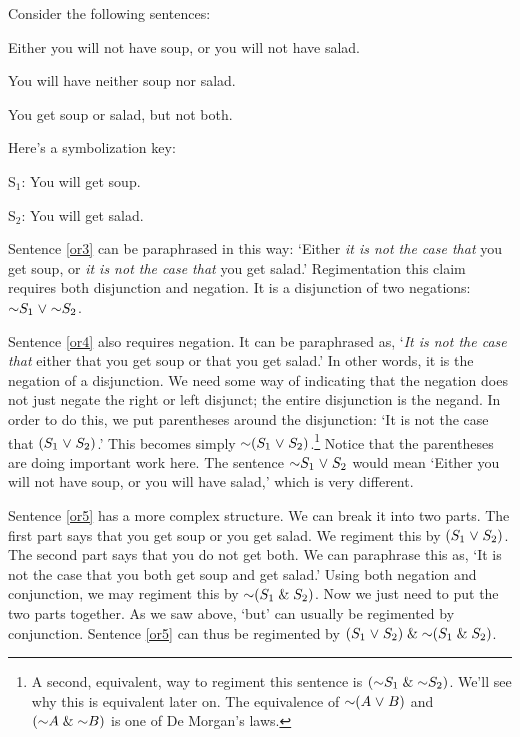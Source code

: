 Consider the following sentences:

\begin{earg}
\item[\ex{or3}] Either you will not have soup, or you will not have salad.
\item[\ex{or4}] You will have neither soup nor salad.
\item[\ex{or5}] You get soup or salad, but not both.
\end{earg}

Here's a symbolization key:

\begin{ekey}
\item[S$_1$:] You will get soup.
\item[S$_2$:] You will get salad.
\end{ekey}

Sentence \ref{or3} can be paraphrased in this way: `Either \emph{it is not the case that} you get soup, or \emph{it is not the case that} you get salad.' 
Regimentation this claim requires both disjunction and negation.
It is a disjunction of two negations: $\enot S_1 \eor \enot S_2$.

Sentence \ref{or4} also requires negation.
It can be paraphrased as, `\emph{It is not the case that} either that you get soup or that you get salad.'
In other words, it is the negation of a disjunction.
We need some way of indicating that the negation does not just negate the right or left disjunct; the entire disjunction is the negand.
In order to do this, we put parentheses around the disjunction: `It is not the case that $(S_1 \mkern1mu\vee\mkern1mu S_2)$.'
This becomes simply $\enot (S_1 \eor S_2)$.\footnote{A second, equivalent, way to regiment this sentence is $(\enot S_1 \eand \enot S_2)$. We'll see why this is equivalent later on. The equivalence of $\enot (A \eor B)$ and $(\enot A \eand \enot B)$ is one of De Morgan's laws.}
Notice that the parentheses are doing important work here.
The sentence $\enot S_1 \eor S_2$ would mean `Either you will not have soup, or you will have salad,' which is very different.

Sentence \ref{or5} has a more complex structure.
We can break it into two parts.
The first part says that you get soup or you get salad.
We regiment this by $(S_1 \mkern1mu\vee\mkern1mu S_2)$.
The second part says that you do not get both.
We can paraphrase this as, `It is not the case that you both get soup and get salad.'
Using both negation and conjunction, we may regiment this by $\enot(S_1 \eand S_2)$.
Now we just need to put the two parts together.
As we saw above, `but' can usually be regimented by conjunction.
Sentence \ref{or5} can thus be regimented by $(S_1 \eor S_2) \eand \enot(S_1 \eand S_2)$.



